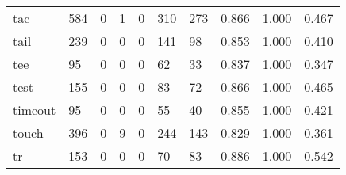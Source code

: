 \begin{longtable}{lp{1.3cm}p{1.3cm}p{1.3cm}p{1.3cm}p{1.3cm}p{1.3cm}p{1.3cm}p{1.3cm}p{1.3cm}}
tac       &                    584 &                                             0 &                                            1 &                                           0 &                                          310 &                                        273 &                                0.866 &                                  1.000 &                                0.467 \\
tail      &                    239 &                                             0 &                                            0 &                                           0 &                                          141 &                                         98 &                                0.853 &                                  1.000 &                                0.410 \\
tee       &                     95 &                                             0 &                                            0 &                                           0 &                                           62 &                                         33 &                                0.837 &                                  1.000 &                                0.347 \\
test      &                    155 &                                             0 &                                            0 &                                           0 &                                           83 &                                         72 &                                0.866 &                                  1.000 &                                0.465 \\
timeout   &                     95 &                                             0 &                                            0 &                                           0 &                                           55 &                                         40 &                                0.855 &                                  1.000 &                                0.421 \\
touch     &                    396 &                                             0 &                                            9 &                                           0 &                                          244 &                                        143 &                                0.829 &                                  1.000 &                                0.361 \\
tr        &                    153 &                                             0 &                                            0 &                                           0 &                                           70 &                                         83 &                                0.886 &                                  1.000 &                                0.542 \\

\end{longtable}
